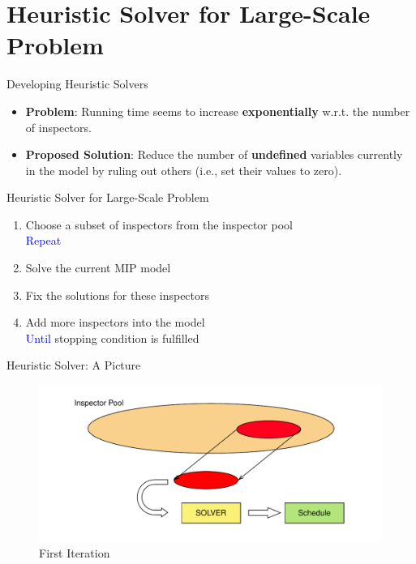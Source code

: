 \documentclass[handout]{beamer}
\begin{document}
\section{Heuristic Solver for Large-Scale Problem}

\begin{frame}{Developing Heuristic Solvers}
\begin{itemize}
    \item \textbf{Problem}: Running time seems to increase \textbf{exponentially} 
    w.r.t. the number of inspectors.
    \item \textbf{Proposed Solution}: Reduce the number of \textbf{undefined}
    variables currently in the model
    by ruling out others (i.e., set their values to zero). 
\end{itemize}

\begin{block}{Heuristic Solver for Large-Scale Problem}
\begin{enumerate}
\item Choose a subset of inspectors from the inspector pool\\
\textcolor{blue}{Repeat}
\item Solve the current MIP model
\item Fix the solutions for these inspectors
\item Add more inspectors into the model \\
\textcolor{blue}{Until} stopping condition is fulfilled
\end{enumerate}
\end{block}
\end{frame}

\begin{frame}{Heuristic Solver: A Picture}
    \begin{figure}
        \centering
        \includegraphics[scale=0.7]{iter1.pdf}
        \caption{First Iteration}
        \label{fig:my_label}
    \end{figure}
\end{frame}
\end{document}
